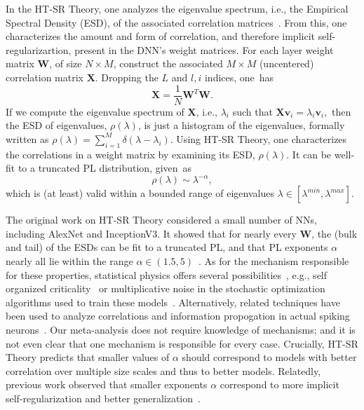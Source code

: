 In the HT-SR Theory, one analyzes the eigenvalue spectrum, i.e., the Empirical Spectral Density (ESD), of the associated correlation matrices~\cite{MM18_TR,MM19_HTSR_ICML,MM20_SDM}.
From this, one characterizes the amount and form of correlation, and therefore implicit self-regularizartion, present in the DNN's weight matrices.
For each layer weight matrix $\mathbf{W}$, of size $N \times M$, construct the associated $M\times M$ (uncentered) correlation matrix $\mathbf{X}$. 
Dropping the $L$ and $l,i$ indices, one~has
$$
\mathbf{X} = \frac{1}{N}\mathbf{W}^{T}\mathbf{W}.
$$
If we compute the eigenvalue spectrum of $\mathbf{X}$, i.e., $\lambda_i$ such that
$  %
\mathbf{X}\mathbf{v}_{i}=\lambda_{i}\mathbf{v}_{i} , 
$  %
then the ESD of eigenvalues, $\rho(\lambda)$, is just a histogram of the eigenvalues, formally written as
$\rho(\lambda)=\sum\nolimits_{i=1}^{M}\delta(\lambda-\lambda_{i})  .$
Using HT-SR Theory, one characterizes the correlations in a weight matrix by examining its ESD, $\rho(\lambda)$.
It can be well-fit to a truncated PL distribution, given~as
\begin{equation}
\rho(\lambda)\sim\lambda^{-\alpha}  ,
\label{eqn:eigenval_pl}
\end{equation}
which is (at least) valid within a bounded range of eigenvalues $\lambda\in[\lambda^{min},\lambda^{max}]$.  

The original work on HT-SR Theory considered a small number of NNs, including AlexNet and InceptionV3. 
It showed that for nearly every $\mathbf{W}$, the (bulk and tail) of the ESDs can be fit to a truncated PL, and that PL exponents $\alpha$ nearly all lie within the range $\alpha\in(1.5,5)$~\cite{MM18_TR,MM19_HTSR_ICML,MM20_SDM}.
%
As for the mechanism responsible for these properties, statistical physics offers several possibilities~\cite{SornetteBook,nishimori01}, e.g., self organized criticality~\cite{SOC87,SOCat25yrs} or multiplicative noise in the stochastic optimization algorithms used to train these models~\cite{HodMah20A_TR,SorCon97}.
Alternatively, related techniques have been used to analyze correlations and information propogation in actual spiking neurons~\cite{SYYRP11,YKYP14}.
Our meta-analysis does not require knowledge of mechanisms; and it is not even clear that one mechanism is responsible for every case.
%
Crucially, HT-SR Theory predicts that smaller values of $\alpha$ should correspond to models with better correlation over multiple size scales and thus to better models.
Relatedly, previous work observed that smaller exponents $\alpha$ correspond to more implicit self-regularization and better generalization~\cite{MM18_TR,MM19_HTSR_ICML,MM20_SDM}.


